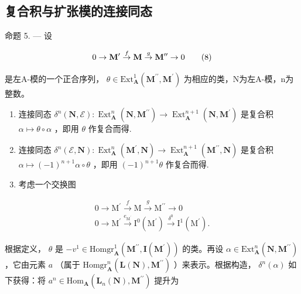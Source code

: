 \subsection{复合积与扩张模的连接同态}

命题 5. --- 设

\[
0 \to {\bf M} ^ {\prime} \stackrel {f} {\to} {\bf M} \stackrel {g} {\to} {\bf M} ^ {\prime \prime} \to 0\tag{8}
\]

是左A-模的一个正合序列， \(\theta\in\mathrm{Ext}_{\mathbf{A}}^{1}\left(\mathbf{M}^{\prime\prime},\mathbf{M}^{\prime}\right)\) 为相应的类，N为左A-模，n为整数。

\begin{enumerate}
\def\labelenumi{\alph{enumi})}
\item
  连接同态 \(\delta^{n}(\mathbf{N},\mathcal{E}):\operatorname{Ext}_{\mathbf{A}}^{n}(\mathbf{N},\mathbf{M}^{\prime \prime})\to \operatorname{Ext}_{\mathbf{A}}^{n + 1}(\mathbf{N},\mathbf{M}^{\prime})\) 是复合积 \(\alpha \mapsto \theta \circ \alpha\) ，即用 \(\theta\) 作复合而得.
\item
  连接同态 \(\delta^{n}(\mathcal{E},\mathbf{N}):\operatorname{Ext}_{\mathbf{A}}^{n}(\mathbf{M}^{\prime},\mathbf{N})\to\operatorname{Ext}_{\mathbf{A}}^{n+1}(\mathbf{M}^{\prime\prime},\mathbf{N})\) 是复合积 \(\alpha\mapsto(-1)^{n+1}\alpha\circ\theta\) ，即用 \((-1)^{n+1}\theta\) 作复合而得.
\item
  考虑一个交换图
\end{enumerate}

\[
\begin{array}{l} 0 \xrightarrow {} \mathrm{M} ^ {\prime} \xrightarrow {f} \mathrm{M} \xrightarrow {g} \mathrm{M} ^ {\prime \prime} \xrightarrow {} 0 \\ 0 \xrightarrow {} \mathrm{M} ^ {\prime} \xrightarrow {e _ {\mathrm{M} ^ {\prime}}} \mathrm{I} ^ {0} (\mathrm{M} ^ {\prime}) \xrightarrow {\delta^ {0}} \mathrm{I} ^ {1} (\mathrm{M} ^ {\prime}). \end{array}
\]

根据定义， \(\theta\) 是 \(-v^{1}\in\mathrm{Homgr}_{\mathbf{A}}^{1}(\mathbf{M}^{\prime\prime},\mathbf{I}(\mathbf{M}^{\prime}))\) 的类。再设 \(\alpha\in\mathrm{Ext}_{\mathbf{A}}^{n}(\mathbf{N},\mathbf{M}^{\prime\prime})\) ，它由元素 \(a\) （属于 \(\mathrm{Homgr}_{\mathbf{A}}^{n}(\mathbf{L}(\mathbf{N}),\mathbf{M}^{\prime\prime})\) ）来表示。根据构造， \(\delta^{n}(\alpha)\) 如下获得：将 \(a^{n}\in\mathrm{Hom}_{\mathbf{A}}(\mathbf{L}_{n}(\mathbf{N}),\mathbf{M}^{\prime\prime})\) 提升为

